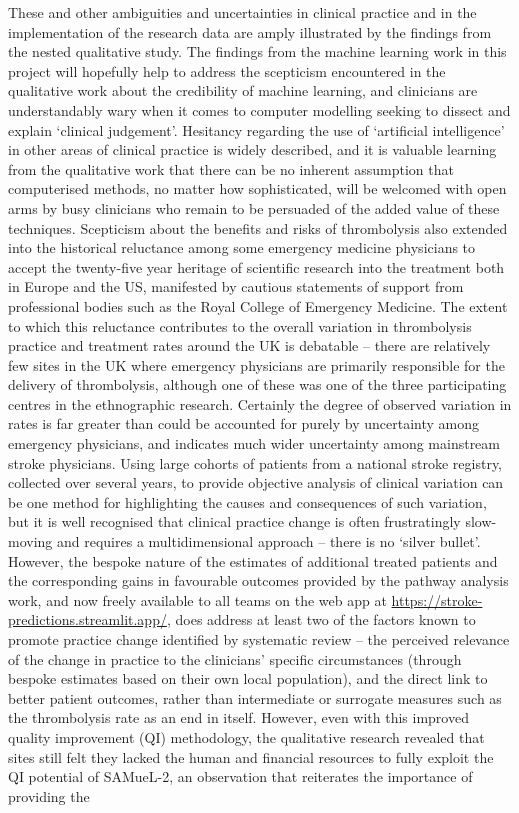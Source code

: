 These and other ambiguities and uncertainties in clinical practice and in the implementation of the research data are amply illustrated by the findings from the nested qualitative study. The findings from the machine learning work in this project will hopefully help to address the scepticism encountered in the qualitative work about the credibility of machine learning, and clinicians are understandably wary when it comes to computer modelling seeking to dissect and explain ‘clinical judgement’. Hesitancy regarding the use of ‘artificial intelligence’ in other areas of clinical practice is widely described, and it is valuable learning from the qualitative work that there can be no inherent assumption that computerised methods, no matter how sophisticated, will be welcomed with open arms by busy clinicians who remain to be persuaded of the added value of these techniques\cite{akinrinmade_artificial_nodate}. Scepticism about the benefits and risks of thrombolysis also extended into the historical reluctance among some emergency medicine physicians to accept the twenty-five year heritage of scientific research into the treatment both in Europe and the US, manifested by cautious statements of support from professional bodies such as the Royal College of Emergency Medicine\cite{royal_college_of_emergency_medicine_acute_2015}. The extent to which this reluctance contributes to the overall variation in thrombolysis practice and treatment rates around the UK is debatable – there are relatively few sites in the UK where emergency physicians are primarily responsible for the delivery of thrombolysis, although one of these was one of the three participating centres in the ethnographic research. Certainly the degree of observed variation in rates is far greater than could be accounted for purely by uncertainty among emergency physicians, and indicates much wider uncertainty among mainstream stroke physicians. Using large cohorts of patients from a national stroke registry, collected over several years, to provide objective analysis of clinical variation can be one method for highlighting the causes and consequences of such variation, but it is well recognised that clinical practice change is often frustratingly slow-moving and requires a multidimensional approach – there is no ‘silver bullet’. However, the bespoke nature of the estimates of additional treated patients and the corresponding gains in favourable outcomes provided by the pathway analysis work, and now freely available to all teams on the web app at \url{https://stroke-predictions.streamlit.app/}, does address at least two of the factors known to promote practice change identified by systematic review \cite{ivers_audit_2012, baker_tailored_nodate} – the perceived relevance of the change in practice to the clinicians’ specific circumstances (through bespoke estimates based on their own local population), and the direct link to better patient outcomes, rather than intermediate or surrogate measures such as the thrombolysis rate as an end in itself. However, even with this improved quality improvement (QI) methodology, the qualitative research revealed that sites still felt they lacked the human and financial resources to fully exploit the QI potential of SAMueL-2, an observation that reiterates the importance of providing the 
